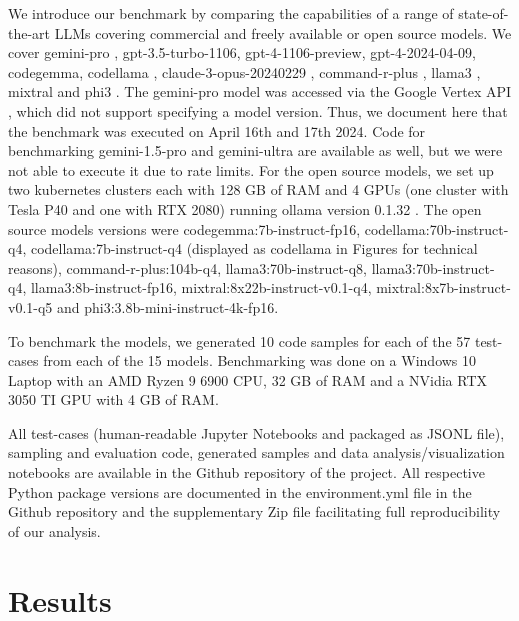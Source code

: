 \documentclass{ecai}
\begin{document}
We introduce our benchmark by comparing the capabilities of a range of state-of-the-art LLMs covering commercial and freely available or open source models. We cover gemini-pro \citep{geminiteam2024gemini}, gpt-3.5-turbo-1106, gpt-4-1106-preview, gpt-4-2024-04-09, codegemma, codellama \citep{roziere2024code}, claude-3-opus-20240229 \citep{anthropic2024claude}, command-r-plus \citep{command_r_plus}, llama3 \citep{llama3}, mixtral \citep{jiang2024mixtral} and phi3 \citep{abdin2024phi3}. The gemini-pro model was accessed via the Google Vertex API \citep{google2024vertex}, which did not support specifying a model version. Thus, we document here that the benchmark was executed on April 16th and 17th 2024. Code for benchmarking gemini-1.5-pro and gemini-ultra are available as well, but we were not able to execute it due to rate limits. For the open source models, we set up two kubernetes clusters each with 128 GB of RAM and 4 GPUs (one cluster with Tesla P40 and one with RTX 2080) running ollama version 0.1.32 \citep{ollama2024}. The open source models versions were codegemma:7b-instruct-fp16, codellama:70b-instruct-q4, codellama:7b-instruct-q4 (displayed as codellama in Figures for technical reasons), command-r-plus:104b-q4, llama3:70b-instruct-q8, llama3:70b-instruct-q4, llama3:8b-instruct-fp16, mixtral:8x22b-instruct-v0.1-q4, mixtral:8x7b-instruct-v0.1-q5 and phi3:3.8b-mini-instruct-4k-fp16.

To benchmark the models, we generated 10 code samples for each of the 57 test-cases from each of the 15 models. Benchmarking was done on a Windows 10 Laptop with an AMD Ryzen 9 6900 CPU, 32 GB of RAM and a NVidia RTX 3050 TI GPU with 4 GB of RAM.

All test-cases (human-readable Jupyter Notebooks and packaged as JSONL file), sampling and evaluation code, generated samples and data analysis/visualization notebooks are available in the Github repository of the project. All respective Python package versions are documented in the environment.yml file in the Github repository and the supplementary Zip file facilitating full reproducibility of our analysis.





\section{Results}
\end{document}
